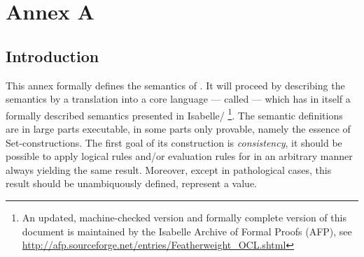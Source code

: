 \part{Annex A}
\chapter{Introduction}
This annex formally defines the semantics of \OCL. It will proceed by describing 
the \OCL semantics by a translation into a core language --- called  \FOCL ---
which has in itself a formally described semantics presented in 
Isabelle/\HOL\cite{nipkow.ea:isabelle:2002}
\footnote{An updated, machine-checked version and formally complete version of 
        this document is maintained
        by the Isabelle Archive of Formal Proofs (AFP), see
\url{http://afp.sourceforge.net/entries/Featherweight_OCL.shtml}}. 
The semantic definitions are in large parts executable, in some parts only provable, 
namely the essence of Set-constructions. The first goal of its construction is 
\emph{consistency}, \ie{} it should be possible to apply logical rules and/or evaluation 
rules for \OCL in an arbitrary manner always yielding the same result. Moreover, except in 
pathological cases, this result should be unambiquously defined, \ie{} represent a value.

